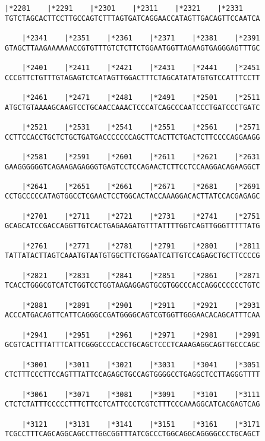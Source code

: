 \documentclass{article}
\begin{document}
\begin{Verbatim}[fontfamily=courier]
    |*2281    |*2291    |*2301    |*2311    |*2321    |*2331
TGTCTAGCACTTCCTTGCCAGTCTTTAGTGATCAGGAACCATAGTTGACAGTTCCAATCA

    |*2341    |*2351    |*2361    |*2371    |*2381    |*2391
GTAGCTTAAGAAAAAACCGTGTTTGTCTCTTCTGGAATGGTTAGAAGTGAGGGAGTTTGC

    |*2401    |*2411    |*2421    |*2431    |*2441    |*2451
CCCGTTCTGTTTGTAGAGTCTCATAGTTGGACTTTCTAGCATATATGTGTCCATTTCCTT

    |*2461    |*2471    |*2481    |*2491    |*2501    |*2511
ATGCTGTAAAAGCAAGTCCTGCAACCAAACTCCCATCAGCCCAATCCCTGATCCCTGATC

    |*2521    |*2531    |*2541    |*2551    |*2561    |*2571
CCTTCCACCTGCTCTGCTGATGACCCCCCCAGCTTCACTTCTGACTCTTCCCCAGGAAGG

    |*2581    |*2591    |*2601    |*2611    |*2621    |*2631
GAAGGGGGGTCAGAAGAGAGGGTGAGTCCTCCAGAACTCTTCCTCCAAGGACAGAAGGCT

    |*2641    |*2651    |*2661    |*2671    |*2681    |*2691
CCTGCCCCCATAGTGGCCTCGAACTCCTGGCACTACCAAAGGACACTTATCCACGAGAGC

    |*2701    |*2711    |*2721    |*2731    |*2741    |*2751
GCAGCATCCGACCAGGTTGTCACTGAGAAGATGTTTATTTTGGTCAGTTGGGTTTTTATG

    |*2761    |*2771    |*2781    |*2791    |*2801    |*2811
TATTATACTTAGTCAAATGTAATGTGGCTTCTGGAATCATTGTCCAGAGCTGCTTCCCCG

    |*2821    |*2831    |*2841    |*2851    |*2861    |*2871
TCACCTGGGCGTCATCTGGTCCTGGTAAGAGGAGTGCGTGGCCCACCAGGCCCCCCTGTC

    |*2881    |*2891    |*2901    |*2911    |*2921    |*2931
ACCCATGACAGTTCATTCAGGGCCGATGGGGCAGTCGTGGTTGGGAACACAGCATTTCAA

    |*2941    |*2951    |*2961    |*2971    |*2981    |*2991
GCGTCACTTTATTTCATTCGGGCCCCACCTGCAGCTCCCTCAAAGAGGCAGTTGCCCAGC

    |*3001    |*3011    |*3021    |*3031    |*3041    |*3051
CTCTTTCCCTTCCAGTTTATTCCAGAGCTGCCAGTGGGGCCTGAGGCTCCTTAGGGTTTT

    |*3061    |*3071    |*3081    |*3091    |*3101    |*3111
CTCTCTATTTCCCCCTTTCTTCCTCATTCCCTCGTCTTTCCCAAAGGCATCACGAGTCAG

    |*3121    |*3131    |*3141    |*3151    |*3161    |*3171
TCGCCTTTCAGCAGGCAGCCTTGGCGGTTTATCGCCCTGGCAGGCAGGGGCCCTGCAGCT

\end{Verbatim}
\newpage
\end{document}
